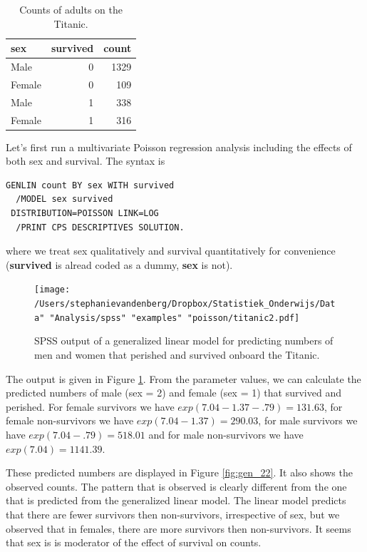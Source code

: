 \documentclass[]{report}\usepackage[]{graphicx}\usepackage[]{color}
\begin{document}
\begin{table}[ht]
\centering
\caption{Counts of adults on the Titanic.} 
\label{tab:gen_21}
\begin{tabular}{lrr}
  \hline
sex & survived & count \\ 
  \hline
Male & 0 & 1329 \\ 
  Female & 0 & 109 \\ 
  Male & 1 & 338 \\ 
  Female & 1 & 316 \\ 
   \hline
\end{tabular}
\end{table}


Let's first run a multivariate Poisson regression analysis including the effects of both sex and survival. The syntax is


\begin{verbatim}
GENLIN count BY sex WITH survived
  /MODEL sex survived
 DISTRIBUTION=POISSON LINK=LOG
  /PRINT CPS DESCRIPTIVES SOLUTION.
\end{verbatim}

where we treat sex qualitatively and survival quantitatively for convenience (\textbf{survived} is alread coded as a dummy, \textbf{sex} is not).


\begin{figure}[h]
    \begin{center}
       \texttt{[image: /Users/stephanievandenberg/Dropbox/Statistiek\_Onderwijs/Data" "Analysis/spss" "examples" "poisson/titanic2.pdf]}
    \end{center}
     \caption{SPSS output of a generalized linear model for predicting numbers of men and women that perished and survived onboard the Titanic.}
    \label{fig:titanic2}
\end{figure}

The output is given in Figure \ref{fig:titanic2}. From the parameter values, we can calculate the predicted numbers of male (sex = 2) and female (sex = 1) that survived and perished. For female survivors we have $exp(7.04 -1.37 -.79)=131.63$, for female non-survivors we have $exp(7.04 -1.37)=290.03$, for male survivors we have $exp(7.04 -.79)=518.01$ and for male non-survivors we have $exp(7.04)=1141.39$.


These predicted numbers are displayed in Figure \ref{fig:gen_22}. It also shows the observed counts. The pattern that is observed is clearly different from the one that is predicted from the generalized linear model. The linear model predicts that there are fewer survivors then non-survivors, irrespective of sex, but we observed that in females, there are more survivors then non-survivors. It seems that sex is is moderator of the effect of survival on counts.
\end{document}
